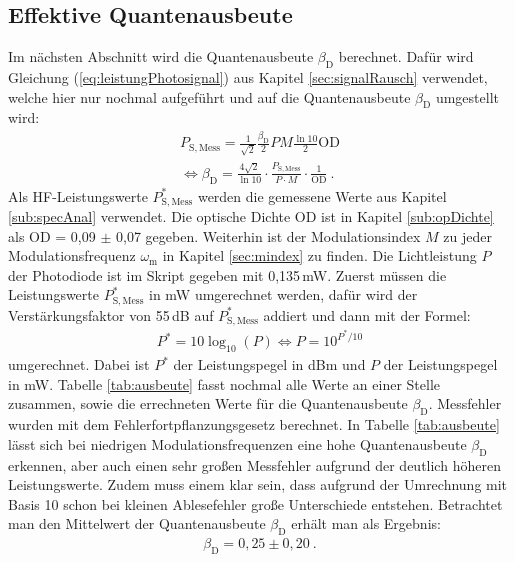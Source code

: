 \newpage

\subsection{Effektive Quantenausbeute}
\label{sub:ausbeute}

Im nächsten Abschnitt wird die Quantenausbeute $\beta_\mathrm{D}$ berechnet. Dafür wird Gleichung (\ref{eq:leistungPhotosignal}) aus Kapitel \ref{sec:signalRausch} verwendet, welche hier nur nochmal aufgeführt und auf die Quantenausbeute $\beta_\mathrm{D}$ umgestellt wird:
\begin{gather}
    P_\mathrm{S,Mess} = \frac{1}{\sqrt{2}}\frac{\beta_\mathrm{D}}{2} P M \frac{\ln10}{2} \mathrm{OD}\\[0,5cm]
    \Leftrightarrow \beta_\mathrm{D} = \frac{4\sqrt{2}}{\ln10}\cdot\frac{P_\mathrm{S,Mess}}{P\cdot M}\cdot\frac{1}{\mathrm{OD}}~.
\end{gather}
Als HF-Leistungswerte $P^*_\mathrm{S,Mess}$ werden die gemessene Werte aus Kapitel \ref{sub:specAnal} verwendet. Die optische Dichte OD ist in Kapitel \ref{sub:opDichte} als OD = 0,09 $\pm$ 0,07 gegeben. Weiterhin ist der Modulationsindex $M$ zu jeder Modulationsfrequenz $\omega_\mathrm{m}$ in Kapitel \ref{sec:mindex} zu finden. Die Lichtleistung $P$ der Photodiode ist im Skript gegeben mit 0,135\,mW. Zuerst müssen die Leistungswerte $P^*_\mathrm{S,Mess}$ in mW umgerechnet werden, dafür wird der Verstärkungsfaktor von 55\,dB auf $P^*_\mathrm{S,Mess}$ addiert und dann mit der Formel:
\begin{gather}
    P^* = 10\log_{10}(P) \Leftrightarrow P = 10^{P^*/10}
    \label{eq:dBmTomW}
\end{gather}
umgerechnet. \cite{anleitung} Dabei ist $P^*$ der Leistungspegel in dBm und $P$ der Leistungspegel in mW. Tabelle \ref{tab:ausbeute} fasst nochmal alle Werte an einer Stelle zusammen, sowie die errechneten Werte für die Quantenausbeute $\beta_\mathrm{D}$. Messfehler wurden mit dem Fehlerfortpflanzungsgesetz berechnet. In Tabelle \ref{tab:ausbeute} lässt sich bei niedrigen Modulationsfrequenzen eine hohe Quantenausbeute $\beta_\mathrm{D}$ erkennen, aber auch einen sehr großen Messfehler aufgrund der deutlich höheren Leistungswerte. Zudem muss einem klar sein, dass aufgrund der Umrechnung mit Basis 10 schon bei kleinen Ablesefehler große Unterschiede entstehen. Betrachtet man den Mittelwert der Quantenausbeute $\beta_\mathrm{D}$ erhält man als Ergebnis:
\begin{gather}
    \boxed{\beta_\mathrm{D} = 0,25 \pm 0,20}~.
\end{gather}
